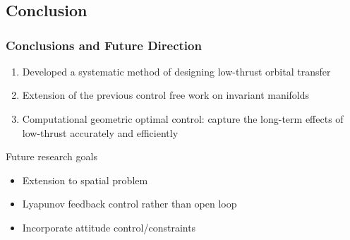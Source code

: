 
\section*{}
\subsection*{Conclusion}
\begin{frame} %
\frametitle{Conclusions and Future Direction}
  \begin{enumerate}
  	\item Developed a systematic method of designing low-thrust orbital transfer
  	\item Extension of the previous control free work on invariant manifolds
	\item Computational geometric optimal control: capture the long-term effects of low-thrust accurately and efficiently  	
  \end{enumerate}
  \pause
  Future research goals
  	\begin{itemize} 
	  \item Extension to spatial problem 
	  \item Lyapunov feedback control rather than open loop 
	  \item Incorporate attitude control/constraints 
	\end{itemize}
\end{frame}   %

